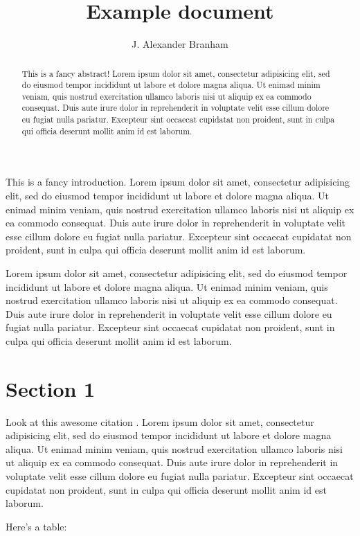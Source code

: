 \documentclass[12pt]{article}
\title{Example document}
\author{J. Alexander Branham}
\begin{document}
\maketitle{}
\begin{abstract}
  This is a fancy abstract! Lorem ipsum dolor sit amet, consectetur adipisicing elit, sed do eiusmod tempor incididunt ut labore et dolore magna aliqua. Ut enimad minim veniam, quis nostrud exercitation ullamco laboris nisi ut aliquip ex ea commodo consequat. Duis aute irure dolor in reprehenderit in voluptate velit esse cillum dolore eu fugiat nulla pariatur. Excepteur sint occaecat cupidatat non proident, sunt in culpa qui officia deserunt mollit anim id est laborum.
\end{abstract}


This is a fancy introduction. Lorem ipsum dolor sit amet, consectetur adipisicing elit, sed do eiusmod tempor incididunt ut labore et dolore magna aliqua. Ut enimad minim veniam, quis nostrud exercitation ullamco laboris nisi ut aliquip ex ea commodo consequat. Duis aute irure dolor in reprehenderit in voluptate velit esse cillum dolore eu fugiat nulla pariatur. Excepteur sint occaecat cupidatat non proident, sunt in culpa qui officia deserunt mollit anim id est laborum.

Lorem ipsum dolor sit amet, consectetur adipisicing elit, sed do eiusmod tempor incididunt ut labore et dolore magna aliqua. Ut enimad minim veniam, quis nostrud exercitation ullamco laboris nisi ut aliquip ex ea commodo consequat. Duis aute irure dolor in reprehenderit in voluptate velit esse cillum dolore eu fugiat nulla pariatur. Excepteur sint occaecat cupidatat non proident, sunt in culpa qui officia deserunt mollit anim id est laborum.

\section{Section 1}
\label{sec:section-1}

Look at this awesome citation \autocite{apfeld2016}. Lorem ipsum dolor sit amet, consectetur adipisicing elit, sed do eiusmod tempor incididunt ut labore et dolore magna aliqua. Ut enimad minim veniam, quis nostrud exercitation ullamco laboris nisi ut aliquip ex ea commodo consequat. Duis aute irure dolor in reprehenderit in voluptate velit esse cillum dolore eu fugiat nulla pariatur. Excepteur sint occaecat cupidatat non proident, sunt in culpa qui officia deserunt mollit anim id est laborum.

Here's a table:
\end{document}
